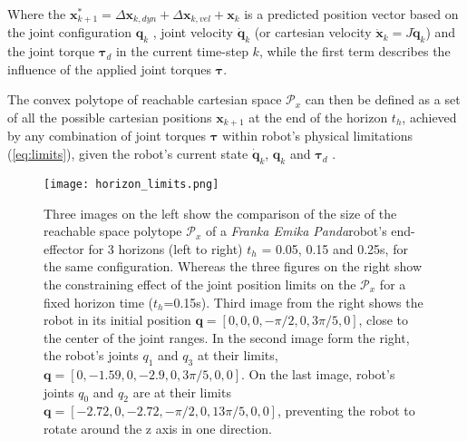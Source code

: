 Where the $\bm{x}^*_{k+1}\! =\!\Delta \bm{x}_{k,dyn}\! +\! \Delta \bm{x}_{k,vel} + \bm{x}_{k}$ is a predicted position vector based on the joint configuration $\bm{q}_k$ , joint velocity $\dot{\bm{q}}_k$ (or cartesian velocity  $\dot{\bm{x}}_k\!=\!J\dot{\bm{q}}_k$) and the joint torque $\bm{\tau}_d$ in the current time-step $k$, while the first term describes the influence of the applied joint torques $\bm{\tau}$.

The convex polytope of reachable cartesian space $\mathcal{P}_x$ can then be defined as a set of all the possible cartesian positions $\bm{x}_{k+1}$ at the end of the horizon $t_h$, achieved by any combination of joint torques $\bm{\tau}$ within robot's physical limitations (\ref{eq:limits}), given the robot's current state $\dot{\bm{q}}_k$, $\bm{q}_k$ and $\bm{\tau}_d$ .

\begin{figure}[!t]
    \centering
    \texttt{[image: horizon\_limits.png]}
    \caption{Three images on the left show the comparison of the size of the reachable space polytope $\mathcal{P}_x$ of a \textit{Franka Emika Panda}\protect\footnotemark robot's end-effector for 3 horizons  (left to right) $t_h$ = 0.05, 0.15 and 0.25s, for the same configuration. Whereas the three figures on the right show the constraining effect of the joint position limits on the $\mathcal{P}_x$ for a fixed horizon time ($t_h$=0.15s).
    Third image from the right shows the robot in its initial position $\bm{q}=[0,0,0,-\pi/2, 0, 3\pi/5,0]$, close to the center of the joint ranges. In the second image form the right, the robot's joints $q_1$ and $q_3$ at their limits, $\bm{q}=[0,-1.59,0,-2.9,0,3\pi/5,0,0]$. On the last image, robot's joints $q_0$ and $q_2$ are at their limits $\bm{q}=[-2.72,0, -2.72,-\pi/2,0,13\pi/5,0,0]$, preventing the robot to rotate around the z axis in one direction.} 
    \label{fig:horizon}
\end{figure}


